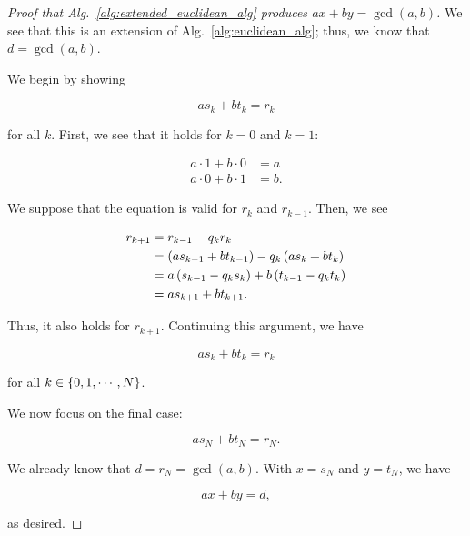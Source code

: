 \begin{proof}[Proof that Alg.~\ref{alg:extended_euclidean_alg} produces
    $ax + by = \gcd(a,b)$]

We see that this is an extension of Alg.~\ref{alg:euclidean_alg};
thus, we know that $d = \gcd(a,b)$.

We begin by showing

\begin{equation}
    as_{k} + bt_{k} = r_{k}
\end{equation}

\noindent
for all $k$.
First, we see that it holds for $k=0$ and $k=1$:

\begin{align}
    a\cdot1 + b\cdot0 &= a \nonumber\\
    a\cdot0 + b\cdot1 &= b.
\end{align}

\noindent
We suppose that the equation is valid for $r_{k}$ and $r_{k-1}$.
Then, we see

\begin{align}
    r_{k+1} &= r_{k-1} - q_{k}r_{k} \nonumber\\
        &= \left( as_{k-1} + bt_{k-1} \right) - q_{k}\left( as_{k} + bt_{k} \right)
            \nonumber\\
        &= a\left( s_{k-1} - q_{k}s_{k} \right) + b\left( t_{k-1} - q_{k}t_{k} \right)
            \nonumber\\
        &= as_{k+1} + bt_{k+1}.
\end{align}

\noindent
Thus, it also holds for $r_{k+1}$.
Continuing this argument, we have

\begin{equation}
    as_{k} + bt_{k} = r_{k}
\end{equation}

\noindent
for all $k\in\left\{ 0,1,\cdots,N \right\}$.

We now focus on the final case:

\begin{equation}
    as_{N} + bt_{N} = r_{N}.
\end{equation}

\noindent
We already know that $d = r_{N} = \gcd(a,b)$.
With $x = s_{N}$ and $y = t_{N}$, we have

\begin{equation}
    ax + by = d,
\end{equation}

\noindent
as desired.
\end{proof}

